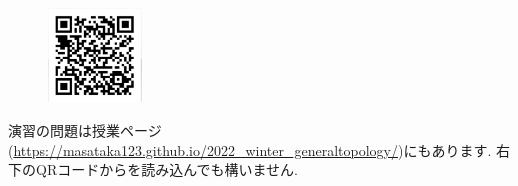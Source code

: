 \documentclass[dvipdfmx,a4paper,11pt]{article}
\newcommand{\R}{\mathbb{R}}
\newcommand{\Z}{\mathbb{Z}}
\newcommand{\Q}{\mathbb{Q}}
\theoremstyle{definition}
\begin{document}

 
 \vspace{11pt}
\begin{figure}
  \centering
 \includegraphics[height=25mm, width=25mm]{genetopo.png}
\end{figure}


演習の問題は授業ページ(\url{https://masataka123.github.io/2022_winter_generaltopology/})にもあります. 
右下のQRコードからを読み込んでも構いません.


 
\end{document}
